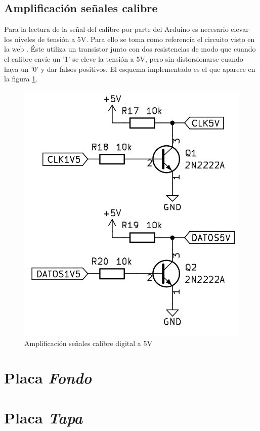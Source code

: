 \subsection{Amplificación señales calibre}

Para la lectura de la señal del calibre por parte del Arduino es necesario elevar los niveles de tensión a 5V.
Para ello se toma como referencia el circuito visto en la web \cite{caliper}. Éste utiliza un transistor junto
con dos resistencias de modo que cuando el calibre envíe un '1' se eleve la tensión a 5V, pero sin distorsionarse
cuando haya un '0' y dar falsos positivos. El esquema implementado es el que aparece en la figura \ref{fig:figura36amp}.

\begin{figure}[hbtp]
    \centering
    \includegraphics[width=\textwidth/2]{03-placa/05-amplificacion-calibre.png}
    \caption{Amplificación señales calibre digital a 5V}
    \label{fig:figura36amp}
    \end{figure}


\section{Placa \textit{Fondo}}

\section{Placa \textit{Tapa}}